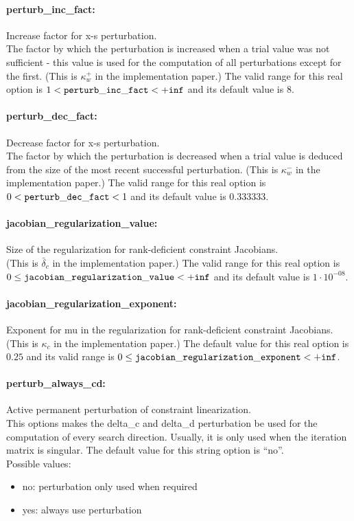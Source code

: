\paragraph{perturb\_inc\_fact:} Increase factor for x-s perturbation. $\;$ \\
 The factor by which the perturbation is increased
when a trial value was not sufficient - this
value is used for the computation of all
perturbations except for the first. (This is
$\kappa_w^+$ in the implementation paper.) The valid range for this real option is 
$1 <  {\tt perturb\_inc\_fact } <  {\tt +inf}$
and its default value is $8$.


\paragraph{perturb\_dec\_fact:} Decrease factor for x-s perturbation. $\;$ \\
 The factor by which the perturbation is decreased
when a trial value is deduced from the size of
the most recent successful perturbation. (This is
$\kappa_w^-$ in the implementation paper.) The valid range for this real option is 
$0 <  {\tt perturb\_dec\_fact } <  1$
and its default value is $0.333333$.


\paragraph{jacobian\_regularization\_value:} Size of the regularization for rank-deficient constraint Jacobians. $\;$ \\
 (This is $\bar\delta_c$ in the implementation
paper.) The valid range for this real option is\\ 
$0 \le {\tt jacobian\_regularization\_value } <  {\tt +inf}$
and its default value is $1 \cdot 10^{-08}$.


\paragraph{jacobian\_regularization\_exponent:} Exponent for mu in the regularization for rank-deficient constraint Jacobians. $\;$ \\
 (This is $\kappa_c$ in the implementation paper.) The default value for this real option is $0.25$
and its valid range is $0 \le {\tt jacobian\_regularization\_exponent } <  {\tt +inf}$.


\paragraph{perturb\_always\_cd:} Active permanent perturbation of constraint linearization. $\;$ \\
 This options makes the delta\_c and delta\_d
perturbation be used for the computation of every
search direction.  Usually, it is only used when
the iteration matrix is singular.
The default value for this string option is ``no''.
\\ 
Possible values:
\begin{itemize}
   \item no: perturbation only used when required
   \item yes: always use perturbation
\end{itemize}

